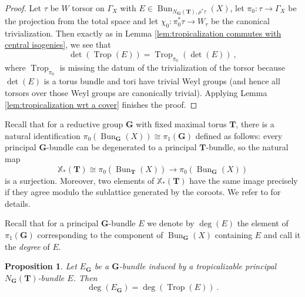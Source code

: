 \documentclass[10pt, a4paper]{amsart}
\newtheorem{proposition}[theorem]{Proposition}
\theoremstyle{definition}
\theoremstyle{myitemstyle}
\newcommand{\bfG}{\mathbf{G}}
\newcommand{\bfT}{\mathbf{T}}
\DeclareMathOperator{\Trop}{Trop}
\DeclareMathOperator{\Bun}{Bun}
\begin{document}
\begin{proof}
Let $\tau$ be $W$ torsor on $\Gamma_X$ with $E\in \Bun_{N_\bfG(\bfT),\rho^*\tau}(X)$, let $\pi_0\colon \tau\to \Gamma_X$ be the projection from the total space and let $\chi_0 \colon\pi_0^*\tau\to W_\tau$ be the canonical trivialization. Then exactly as in Lemma \ref{lem:tropicalization commutes with central isogenies}, we see that 
\[
    \det(\Trop(E))=\Trop_{\pi_0}(\det(E)) \ ,
\]
where $\Trop_{\pi_0}$ is missing the datum of the trivialization of the torsor because $\det(E)$ is a torus bundle and tori have trivial Weyl groups (and hence all torsors over those Weyl groups are canonically trivial). Applying Lemma \ref{lem:tropicalization wrt a cover} finishes the proof.
\end{proof}


Recall that for a reductive group $\mathbf{G}$ with fixed maximal torus $\mathbf{T}$, there is a natural identification $\pi_0(\Bun_{\mathbf{G}}(X))\cong \pi_1(\mathbf{G})$ defined as follows: every principal $\mathbf{G}$-bundle can be degenerated to a principal $\bfT$-bundle, so the natural map
\[
\mathbb{X}_*(\mathbf{T})\cong\pi_0(\Bun_{\mathbf{T}}(X))\longrightarrow \pi_0(\Bun_{\mathbf{G}}(X))
\]
is a surjection. Moreover, two elements of $\mathbb{X}_*(\mathbf{T})$ have the same image precisely if they agree modulo the sublattice generated by the coroots. We refer to \cite{Hoffmann} for details.

Recall that for a principal $\mathbf{G}$-bundle $E$ we denote by $\deg(E)$ the element of $\pi_1(\mathbf{G})$ corresponding to the component of $\Bun_{\mathbf{G}}(X)$ containing $E$  and call it the \emph{degree} of $E$.

\begin{proposition}
\label{prop:tropicalization respects degree} 
    Let $E_\bfG$ be a $\mathbf{G}$-bundle induced by a tropicalizable principal $N_\bfG(\bfT)$-bundle $E$. Then
    \[
    \deg(E_{\mathbf{G}})=\deg(\Trop(E)) \ .
    \]
\end{proposition}
\end{document}
